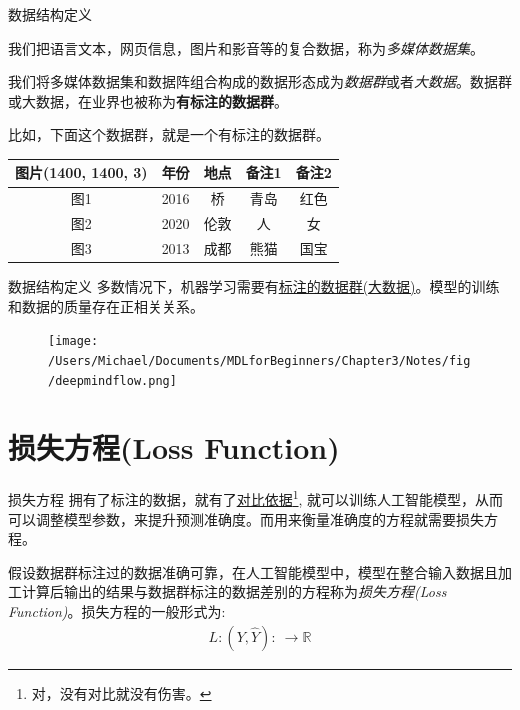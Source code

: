 \documentclass[handout]{beamer}
\newcommand{\rn}{\mathbb{R}}
\begin{document}
\begin{frame}{数据结构定义}
\begin{definition}
	我们把语言文本，网页信息，图片和影音等的复合数据，称为\textit{多媒体数据集}。
\end{definition}

\begin{definition}
	我们将多媒体数据集和数据阵组合构成的数据形态成为\textit{数据群}或者\textit{大数据}。数据群或大数据，在业界也被称为\textbf{有标注的数据群}。
\end{definition}
比如，下面这个数据群，就是一个有标注的数据群。
{\footnotesize
\begin{table}[H]
	\centering
	\renewcommand{\arraystretch}{1.5}
	\begin{tabular}{ccccc}
	\hline 
		图片(1400, 1400, 3) & 年份 & 地点 & 备注1 & 备注2 \\
		\hline 
		图1 & 2016 & 桥 & 青岛 & 红色 \\
		图2 & 2020 &  伦敦 & 人 & 女 \\
		图3 & 2013 & 成都& 熊猫 & 国宝\\
		\hline 
	\end{tabular}
\end{table}
}
\end{frame}

\begin{frame}{数据结构定义}
多数情况下，机器学习需要有\underline{标注的数据群(大数据)}。模型的训练和数据的质量存在正相关关系。
\begin{figure}[H]
	\centering
	\texttt{[image: /Users/Michael/Documents/MDLforBeginners/Chapter3/Notes/fig/deepmindflow.png]}
\end{figure}
\end{frame}


\section{损失方程(Loss Function)}

\begin{frame}{损失方程}
拥有了标注的数据，就有了\underline{对比依据}\footnote[frame]{对，没有对比就没有伤害。}, 就可以训练人工智能模型，从而可以调整模型参数，来提升预测准确度。而用来衡量准确度的方程就需要损失方程。

\hfil

\begin{definition}
	假设数据群标注过的数据准确可靠，在人工智能模型中，模型在整合输入数据且加工计算后输出的结果与数据群标注的数据差别的方程称为\textit{损失方程(Loss Function)}。损失方程的一般形式为:
\begin{align*}
	L: (Y, \hat{Y}): \ \to \rn 
\end{align*}	
\end{definition}
\end{frame}
\end{document}
